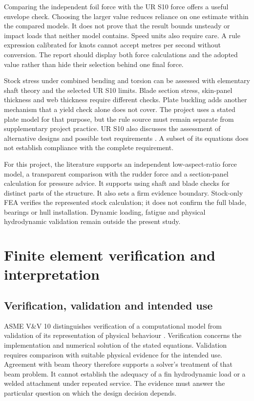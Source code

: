 Comparing the independent foil force with the UR S10 force offers a useful envelope check. Choosing the larger value reduces reliance on one estimate within the compared models. It does not prove that the result bounds unsteady or impact loads that neither model contains. Speed units also require care. A rule expression calibrated for knots cannot accept metres per second without conversion. The report should display both force calculations and the adopted value rather than hide their selection behind one final force.

Stock stress under combined bending and torsion can be assessed with elementary shaft theory and the selected UR S10 limits. Blade section stress, skin-panel thickness and web thickness require different checks. Plate buckling adds another mechanism that a yield check alone does not cover. The project uses a stated plate model for that purpose, but the rule source must remain separate from supplementary project practice. UR S10 also discusses the assessment of alternative designs and possible test requirements \cite{iacsS10}. A subset of its equations does not establish compliance with the complete requirement.

For this project, the literature supports an independent low-aspect-ratio force model, a transparent comparison with the rudder force and a section-panel calculation for pressure advice. It supports using shaft and blade checks for distinct parts of the structure. It also sets a firm evidence boundary. Stock-only FEA verifies the represented stock calculation; it does not confirm the full blade, bearings or hull installation. Dynamic loading, fatigue and physical hydrodynamic validation remain outside the present study.

\section{Finite element verification and interpretation}
\label{sec:lit-fea}

\subsection{Verification, validation and intended use}
\label{sec:lit-vv}

ASME V\&V 10 distinguishes verification of a computational model from validation of its representation of physical behaviour \cite{asmeVV10}. Verification concerns the implementation and numerical solution of the stated equations. Validation requires comparison with suitable physical evidence for the intended use. Agreement with beam theory therefore supports a solver's treatment of that beam problem. It cannot establish the adequacy of a fin hydrodynamic load or a welded attachment under repeated service. The evidence must answer the particular question on which the design decision depends.

